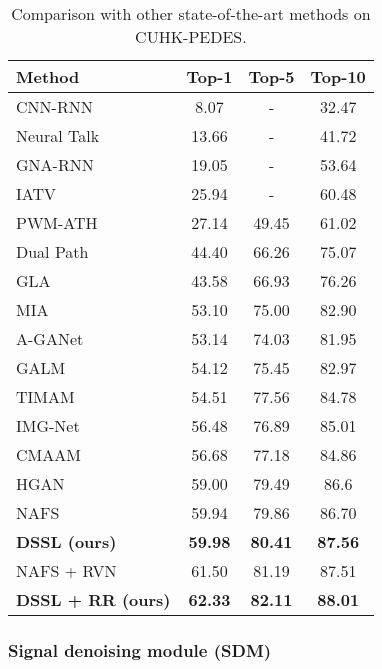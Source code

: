 \documentclass[sigconf]{acmart}
\begin{document}
\begin{table}
	\caption{Comparison with other state-of-the-art methods on CUHK-PEDES.}
	\label{tab:sota}
	\begin{tabular}{l|ccc}
		\toprule
		Method & Top-1 & Top-5 & Top-10 \\
		\midrule
		CNN-RNN \cite{reed2016learning} & 8.07  & -  & 32.47 \\
		Neural Talk \cite{vinyals2015show} & 13.66  & -  & 41.72 \\
		GNA-RNN \cite{Shuang2017Person} & 19.05  & -  & 53.64 \\
		IATV \cite{li2017identity} & 25.94  & -  & 60.48 \\
		PWM-ATH \cite{Chen2018} & 27.14  & 49.45  & 61.02 \\
		Dual Path \cite{zheng2020dual} & 44.40  & 66.26  & 75.07 \\
		GLA \cite{chen2018improving} & 43.58  & 66.93  & 76.26 \\
		MIA  \cite{niu2020improving} & 53.10 & 75.00 & 82.90 \\
		A-GANet \cite{mm2019graphreid} & 53.14 & 74.03 & 81.95 \\
		GALM \cite{Jing2018Pose} & 54.12 & 75.45 & 82.97 \\
		TIMAM \cite{ARL} & 54.51 & 77.56 & 84.78 \\
		IMG-Net \cite{wang2020img} & 56.48 & 76.89 & 85.01 \\
		CMAAM \cite{aggarwal2020text} & 56.68 &	77.18 &	84.86 \\
		HGAN \cite{zheng2020hierarchical} & 59.00 & 79.49 & 86.6 \\
		NAFS \cite{gao2021contextual} & 59.94 & 79.86 & 86.70 \\
		\textbf{DSSL (ours)} & \textbf{59.98} & \textbf{80.41} & \textbf{87.56} \\
		\midrule
		NAFS + RVN \cite{gao2021contextual} & 61.50 & 81.19 & 87.51 \\
		\textbf{DSSL + RR (ours)} & \textbf{62.33} & \textbf{82.11} & \textbf{88.01} \\
		\bottomrule
	\end{tabular}
\end{table}

\subsubsection{Signal denoising module (SDM)}
\label{sec:exp_SDM}
\end{document}
